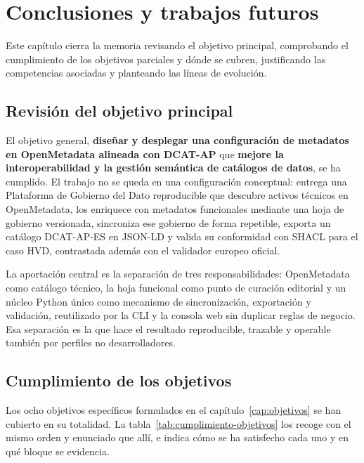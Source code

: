 \chapter{Conclusiones y trabajos futuros}\label{cap:conclusiones}

Este capítulo cierra la memoria revisando el objetivo principal, comprobando el cumplimiento de los objetivos parciales y dónde se cubren, justificando las competencias asociadas y planteando las líneas de evolución.

\section{Revisión del objetivo principal}

El objetivo general, \textbf{diseñar y desplegar una configuración de metadatos en OpenMetadata alineada con DCAT-AP} que \textbf{mejore la interoperabilidad y la gestión semántica de catálogos de datos}, se ha cumplido. El trabajo no se queda en una configuración conceptual: entrega una Plataforma de Gobierno del Dato reproducible que descubre activos técnicos en OpenMetadata, los enriquece con metadatos funcionales mediante una hoja de gobierno versionada, sincroniza ese gobierno de forma repetible, exporta un catálogo DCAT-AP-ES en JSON-LD y valida su conformidad con SHACL para el caso HVD, contrastada además con el validador europeo oficial.

La aportación central es la separación de tres responsabilidades: OpenMetadata como catálogo técnico, la hoja funcional como punto de curación editorial y un núcleo Python único como mecanismo de sincronización, exportación y validación, reutilizado por la CLI y la consola web sin duplicar reglas de negocio. Esa separación es la que hace el resultado reproducible, trazable y operable también por perfiles no desarrolladores.

\section{Cumplimiento de los objetivos}

Los ocho objetivos específicos formulados en el capítulo~\ref{cap:objetivos} se han cubierto en su totalidad. La tabla~\ref{tab:cumplimiento-objetivos} los recoge con el mismo orden y enunciado que allí, e indica cómo se ha satisfecho cada uno y en qué bloque se evidencia.

